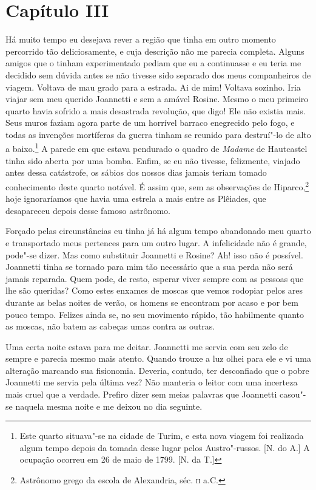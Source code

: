 \section*{Capítulo III}

 Há muito tempo eu desejava rever a região que tinha em outro momento
percorrido tão deliciosamente, e cuja descrição não me parecia
completa. Alguns amigos que o tinham experimentado pediam que eu a
continuasse e eu teria me decidido sem dúvida antes se não tivesse sido
separado dos meus companheiros de viagem. Voltava de mau grado para a
estrada. Ai de mim! Voltava sozinho. Iria viajar sem meu querido
Joannetti e sem a amável Rosine. Mesmo o meu primeiro quarto havia
sofrido a mais desastrada revolução, que digo! Ele não existia mais.
Seus muros faziam agora parte de um horrível barraco enegrecido pelo
fogo, e todas as invenções mortíferas da guerra tinham se reunido para
destruí"-lo de alto a baixo.\footnote{ Este quarto situava"-se na cidade
de Turim, e esta nova viagem foi realizada algum tempo depois da tomada
desse lugar pelos Austro"-russos. [N. do A.]  A ocupação ocorreu em 26 de maio
de 1799. [N. da T.]} A parede em que estava pendurado o quadro de \textit{Madame} de
Hautcastel tinha sido aberta por uma bomba. Enfim, se eu não tivesse,
felizmente, viajado antes dessa catástrofe, os sábios dos nossos dias
jamais teriam tomado conhecimento deste quarto notável. É assim que,
sem as observações de Hiparco,\footnote{ Astrônomo grego da escola de
Alexandria, séc. \textsc{ii} a.C.} hoje ignoraríamos que havia uma estrela a
mais entre as Plêiades, que desapareceu depois desse famoso astrônomo. 

 Forçado pelas circunstâncias eu tinha já há algum tempo abandonado meu
quarto e transportado meus pertences para um outro lugar. A
infelicidade não é grande, pode"-se dizer. Mas como substituir Joannetti
e Rosine? Ah! isso não é possível. Joannetti tinha se tornado para mim tão
necessário que a sua perda não será jamais reparada. Quem
pode, de resto, esperar viver sempre com as pessoas que lhe são
queridas? Como estes enxames de moscas que vemos rodopiar pelos ares
durante as belas noites de verão, os homens se encontram por acaso e
por bem pouco tempo. Felizes ainda se, no seu movimento rápido, tão
habilmente quanto as moscas, não batem as cabeças umas contra as outras.


 Uma certa noite estava para me deitar. Joannetti me servia com seu zelo
de sempre e parecia mesmo mais atento. Quando trouxe a luz olhei para
ele e vi uma alteração marcando sua fisionomia. Deveria, contudo, ter
desconfiado que o pobre Joannetti me servia pela última vez? Não
manteria o leitor com uma incerteza mais cruel que a verdade. Prefiro
dizer sem meias palavras que Joannetti casou"-se naquela mesma noite e
me deixou no dia seguinte.

